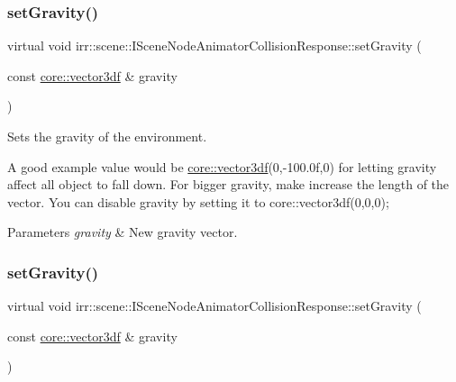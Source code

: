 \subsubsection{\texorpdfstring{set\+Gravity()}{setGravity()}\hspace{0.1cm}{\footnotesize\ttfamily [1/2]}}
{\footnotesize\ttfamily virtual void irr\+::scene\+::\+I\+Scene\+Node\+Animator\+Collision\+Response\+::set\+Gravity (\begin{DoxyParamCaption}\item[{const \hyperlink{namespaceirr_1_1core_ae6e2b2a6c552833ebbd5b7463d03586b}{core\+::vector3df} \&}]{gravity }\end{DoxyParamCaption})\hspace{0.3cm}{\ttfamily [pure virtual]}}



Sets the gravity of the environment. 

A good example value would be \hyperlink{namespaceirr_1_1core_ae6e2b2a6c552833ebbd5b7463d03586b}{core\+::vector3df}(0,-\/100.\+0f,0) for letting gravity affect all object to fall down. For bigger gravity, make increase the length of the vector. You can disable gravity by setting it to core\+::vector3df(0,0,0); 
\begin{DoxyParams}{Parameters}
{\em gravity} & New gravity vector. \\
\hline
\end{DoxyParams}
\mbox{\label{classirr_1_1scene_1_1ISceneNodeAnimatorCollisionResponse_af366695a82153c144b58c65cb4d092f3}} 
\subsubsection{\texorpdfstring{set\+Gravity()}{setGravity()}\hspace{0.1cm}{\footnotesize\ttfamily [2/2]}}
{\footnotesize\ttfamily virtual void irr\+::scene\+::\+I\+Scene\+Node\+Animator\+Collision\+Response\+::set\+Gravity (\begin{DoxyParamCaption}\item[{const \hyperlink{namespaceirr_1_1core_ae6e2b2a6c552833ebbd5b7463d03586b}{core\+::vector3df} \&}]{gravity }\end{DoxyParamCaption})\hspace{0.3cm}{\ttfamily [pure virtual]}}



